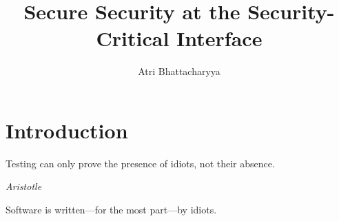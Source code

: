 \documentclass[lablogo]{thesis}
\title{Secure Security at the Security-Critical Interface}
\author{Atri Bhattacharyya}
\begin{document}
\chapter{Introduction}
\epigraph{Testing can only prove the presence of idiots, not their absence.}%
         {\textit{Aristotle}}
Software is written---for the most part---by idiots.
\end{document}
